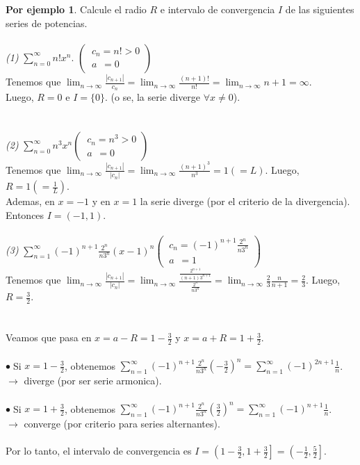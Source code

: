 \documentclass{article}
\theoremstyle{definition}
\theoremstyle{definition}
\newtheorem*{ej}{Por ejemplo}
\theoremstyle{remark}
\newcommand\bl{$\bullet\;$}
\begin{document}
\begin{ej}
  Calcule el radio $R$ e intervalo de convergencia $I$ de las siguientes series de potencias. \\ \\ 
\emph{(1)} $\sum_{n=0}^{\infty}{n!x^n}$. \quad \quad $\left(\
  \begin{array}{l}
c_n=n! > 0 \\ 
a\phantom{_n}=0
  \end{array}
  \right)$ \\
Tenemos que $\lim_{n\to\infty}{\frac{|c_{n+1}|}{c_n}}=\lim_{n\to\infty}{\frac{(n+1)!}{n!}}=\lim_{n\to\infty}{n+1}=\infty.$ \\Luego, $R=0$ e $I=\{0\}$. (o se, la serie diverge $\forall x \neq 0$). \\ \\ \\ 
\emph{(2)} $\sum_{n=0}^{\infty}{n^3x^n}$\quad \quad $\left(\
  \begin{array}{l}
    c_n=n^3 > 0 \\ 
a\phantom{_n}=0
  \end{array}
  \right)$ \\
  Tenemos que $\lim_{n\to\infty}{\frac{|c_{n+1}|}{|c_n|}}=\lim_{n\to\infty}{\frac{(n+1)^3}{n^3}}=1(=L)$. Luego, $R=1(=\frac{1}{L})$. \\
  Ademas, en $x=-1$ y en $x=1$ la serie diverge (por el criterio de la divergencia). \\
  Entonces $I=(-1,1).$
\\ \\
\emph{(3)} $\sum_{n=1}^{\infty}{(-1)^{n+1}\frac{2^n}{n3^n}(x-1)^n}$\quad \quad $\left(\
  \begin{array}{l}
    c_n=(-1)^{n+1}\frac{2^n}{n3^n} \\ 
a\phantom{_n}=1
  \end{array}
  \right)$ \\
  Tenemos que $\lim_{n\to\infty}{\frac{|c_{n+1}|}{|c_n|}}
=
\lim_{n\to\infty}{\frac{\frac{2^{n+1}}{(n+1)3^{n+1}}}{\frac{2^n}{n3^n}}}
=
\lim_{n\to\infty}{\frac{2}{3}\frac{n}{n+1}}
=
\frac{2}{3}$. Luego, $R=\frac{3}{2}.$
\\
\\
\\
Veamos que pasa en $x=a-R=1-\frac{3}{2}$\; y \;$x=a+R=1+\frac{3}{2}$. \\\\
\bl Si $x=1-\frac{3}{2}$, obtenemos $\sum_{n=1}^{\infty}{(-1)^{n+1}{\frac{2^n}{n3^n}\left(-\frac{3}{2}\right)^n}}=\sum_{n=1}^{\infty}{(-1)^{2n+1}\frac{1}{n}}$. \\ $\longrightarrow$ diverge (por ser serie armonica). \\ 
\\
\bl Si $x=1+\frac{3}{2}$, obtenemos $\sum_{n=1}^{\infty}{(-1)^{n+1}\frac{2^n}{n3^n}\left(\frac{3}{2}\right)^n}=\sum_{n=1}^{\infty}{(-1)^{n+1}\frac{1}{n}}$. \\ $\longrightarrow$ converge (por criterio para series alternantes). \\ \\ 
Por lo tanto, el intervalo de convergencia es $I=\left(1-\frac{3}{2},1+\frac{3}{2}\right]=\left(-\frac{1}{2},\frac{5}{2}\right]$. 
\end{ej}
\end{document}

